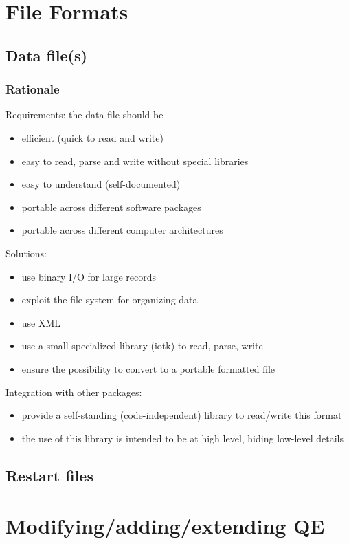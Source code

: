 \documentclass[12pt,a4paper]{article}
\def\qe{QE}
\begin{document}
\section{File Formats}

\subsection{Data file(s)}

\subsubsection{Rationale}

Requirements: the data file should be
\begin{itemize}
\item efficient (quick to read and write)
\item easy to read, parse and write without special libraries
\item easy to understand (self-documented)
\item portable across different software packages
\item portable across different computer architectures
\end{itemize}
Solutions:
\begin{itemize}
\item use binary I/O for large records
\item exploit the file system for organizing data
\item use XML
\item use a small specialized library (iotk) to read, parse, write
\item ensure the possibility to convert to a portable formatted file
\end{itemize}
Integration with other packages:
\begin{itemize}
\item provide a self-standing (code-independent) library to read/write this format
\item the use of this library is intended to be at high level, hiding low-level details
\end{itemize}


\subsection{Restart files}

\section{Modifying/adding/extending \qe}
\end{document}
